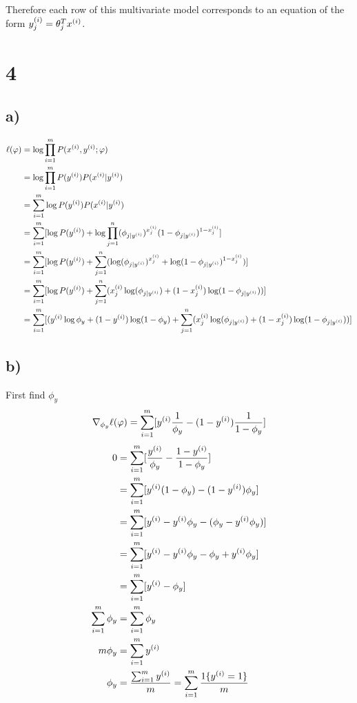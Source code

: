 \documentclass[11pt]{article}
\begin{document}
Therefore each row of this multivariate model corresponds to an equation of the form $y^{(i)}_j = \theta^{T}_j x^{(i)}$.

\section*{4}

\subsection*{a)}

\begin{align*}
    \ell(\varphi) &= \log \prod_{i=1}^m P(x^{(i)}, y^{(i)}; \varphi) \\
                  &= \log \prod_{i=1}^m P(y^{(i)}) P(x^{(i)} | y^{(i)}) \\
                  &= \sum_{i=1}^{m} \log P(y^{(i)}) P(x^{(i)} | y^{(i)}) \\
                  &= \sum_{i=1}^{m} [ \log P(y^{(i)}) + \log \prod_{j=1}^n ( \phi_{j|y^{(i)}})^{x^{(i)}_j} (1 - \phi_{j|y^{(i)}})^{1 - x^{(i)}_j} ] \\
                  &= \sum_{i=1}^{m} [ \log P(y^{(i)}) + \sum_{j=1}^n ( \log(\phi_{j|y^{(i)}})^{x^{(i)}_j} + \log (1 - \phi_{j|y^{(i)}})^{1 - x^{(i)}_j}) ] \\
                  &= \sum_{i=1}^{m} [ \log P(y^{(i)}) + \sum_{j=1}^n ( x^{(i)}_j \log(\phi_{j|y^{(i)}}) + (1 - x^{(i)}_j) \log (1 - \phi_{j|y^{(i)}})) ] \\
                  &= \sum_{i=1}^{m} [ (y^{(i)} \log \phi_y + (1 - y^{(i)}) \log (1 - \phi_y) + \sum_{j=1}^n ( x^{(i)}_j \log(\phi_{j|y^{(i)}}) + (1 - x^{(i)}_j) \log (1 - \phi_{j|y^{(i)}})) ] \\
\end{align*}

\subsection*{b)}

First find $\phi_y$
\begin{align*}
    \nabla_{\phi_y} \ell(\varphi) &= \sum_{i=1}^{m} [ y^{(i)} \frac{1}{\phi_y} - (1 - y^{(i)}) \frac{1}{1 - \phi_y} ] \\
\end{align*}
\begin{align*}
    0               &= \sum_{i=1}^{m} [ \frac{y^{(i)}}{\phi_y} - \frac{1 - y^{(i)}}{1 - \phi_y} ] \\
                    &= \sum_{i=1}^{m} [ y^{(i)} ( 1 - \phi_y) - (1 - y^{(i)}) \phi_y ] \\
                    &= \sum_{i=1}^{m} [ y^{(i)} - y^{(i)} \phi_y - (\phi_y - y^{(i)} \phi_y) ] \\
                    &= \sum_{i=1}^{m} [ y^{(i)} - y^{(i)} \phi_y - \phi_y + y^{(i)} \phi_y ] \\
                    &= \sum_{i=1}^{m} [ y^{(i)} - \phi_y ] \\
    \sum_{i=1}^{m} \phi_y &= \sum_{i=1}^{m} \phi_y \\
    m \phi_y        &= \sum_{i=1}^{m} y^{(i)} \\
    \phi_y          &= \frac{\sum_{i=1}^{m} y^{(i)}}{m} = \sum_{i=1}^{m} \frac{1\{y^{(i)} = 1\}}{m}
\end{align*}
\end{document}
